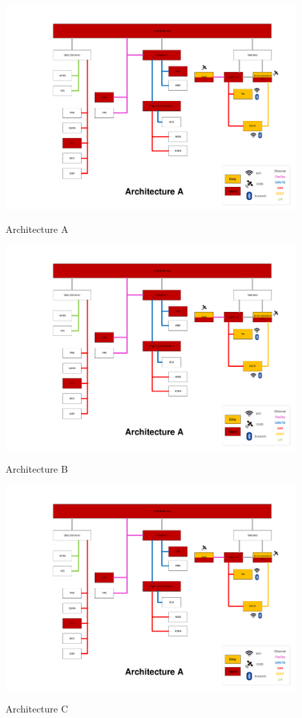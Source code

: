 \begin{figure}[h]
    \centering
    \caption{Architecture A}
    \includegraphics[width=\textwidth, page=1]{../ArchitecturesFINAL2.pdf}
    \label{fig:architectureA}
\end{figure}

\begin{figure}[h]
    \centering
    \caption{Architecture B}
    \includegraphics[width=\textwidth, page=2]{../ArchitecturesFINAL2.pdf}
    \label{fig:architectureB}
\end{figure}

\begin{figure}[h]
    \centering
    \caption{Architecture C}
    \includegraphics[width=\textwidth, page=3]{../ArchitecturesFINAL2.pdf}
    \label{fig:architectureC}
\end{figure}
